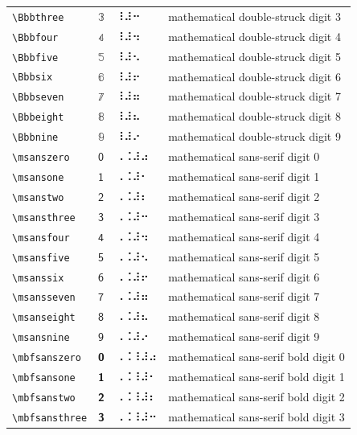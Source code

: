 \documentclass[oneside]{article}
\begin{document}
\begin{longtable}{llll}
\verb|\Bbbthree| & $\Bbbthree$ &  ⠸⠼⠒  & {mathematical double-struck digit 3} \\[2ex]
\verb|\Bbbfour| & $\Bbbfour$ &  ⠸⠼⠲  & {mathematical double-struck digit 4} \\[2ex]
\verb|\Bbbfive| & $\Bbbfive$ &  ⠸⠼⠢  & {mathematical double-struck digit 5} \\[2ex]
\verb|\Bbbsix| & $\Bbbsix$ &  ⠸⠼⠖  & {mathematical double-struck digit 6} \\[2ex]
\verb|\Bbbseven| & $\Bbbseven$ &  ⠸⠼⠶  & {mathematical double-struck digit 7} \\[2ex]
\verb|\Bbbeight| & $\Bbbeight$ &  ⠸⠼⠦  & {mathematical double-struck digit 8} \\[2ex]
\verb|\Bbbnine| & $\Bbbnine$ &  ⠸⠼⠔  & {mathematical double-struck digit 9} \\[2ex]
\verb|\msanszero| & $\msanszero$ &  ⠠⠨⠼⠴  & {mathematical sans-serif digit 0} \\[2ex]
\verb|\msansone| & $\msansone$ &  ⠠⠨⠼⠂  & {mathematical sans-serif digit 1} \\[2ex]
\verb|\msanstwo| & $\msanstwo$ &  ⠠⠨⠼⠆  & {mathematical sans-serif digit 2} \\[2ex]
\verb|\msansthree| & $\msansthree$ &  ⠠⠨⠼⠒  & {mathematical sans-serif digit 3} \\[2ex]
\verb|\msansfour| & $\msansfour$ &  ⠠⠨⠼⠲  & {mathematical sans-serif digit 4} \\[2ex]
\verb|\msansfive| & $\msansfive$ &  ⠠⠨⠼⠢  & {mathematical sans-serif digit 5} \\[2ex]
\verb|\msanssix| & $\msanssix$ &  ⠠⠨⠼⠖  & {mathematical sans-serif digit 6} \\[2ex]
\verb|\msansseven| & $\msansseven$ &  ⠠⠨⠼⠶  & {mathematical sans-serif digit 7} \\[2ex]
\verb|\msanseight| & $\msanseight$ &  ⠠⠨⠼⠦  & {mathematical sans-serif digit 8} \\[2ex]
\verb|\msansnine| & $\msansnine$ &  ⠠⠨⠼⠔  & {mathematical sans-serif digit 9} \\[2ex]
\verb|\mbfsanszero| & $\mbfsanszero$ &  ⠠⠨⠸⠼⠴  & {mathematical sans-serif bold digit 0} \\[2ex]
\verb|\mbfsansone| & $\mbfsansone$ &  ⠠⠨⠸⠼⠂  & {mathematical sans-serif bold digit 1} \\[2ex]
\verb|\mbfsanstwo| & $\mbfsanstwo$ &  ⠠⠨⠸⠼⠆  & {mathematical sans-serif bold digit 2} \\[2ex]
\verb|\mbfsansthree| & $\mbfsansthree$ &  ⠠⠨⠸⠼⠒  & {mathematical sans-serif bold digit 3} \\[2ex]

\end{longtable}
\end{document}
